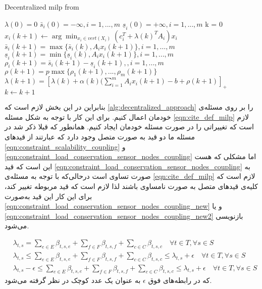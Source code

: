\begin{latin}
	\begin{algorithm}
		\caption{Decentralized milp from \cite{decentralized_approach}}		          \label{alg:decentralized_approach}
		\begin{algorithmic}[1]
			\Procedure{}{}       %
				\State $\lambda(0) = 0$
				\State $\bar{s}_i(0) = -\infty , i = 1,...,m$ 
				\State $\underline{s}_i(0) = +\infty , i = 1,...,m$ 
				\State k = 0
				\Repeat
						\State $x_i(k+1) \gets \arg \displaystyle \min_{x_i \in vert(X_i)} (c_i^T + \lambda(k)^TA_i)x_i$
					\EndFor
					\State $\bar{s}_i(k+1) = \max\{\bar{s}_i(k), A_ix_i(k+1) \} , i = 1, \dots, m$
					\State $\underline{s}_i(k+1) = \min\{\underline{s}_i(k), A_ix_i(k+1) \} , i = 1,...,m$
					\State $\rho_i(k+1) = \bar{s}_i(k+1) - \underline{s}_i(k+1),  , i = 1,...,m$
					\State $\rho(k+1) = p \max \{ \rho_1(k+1), ..., \rho_m(k+1) \}$
					\State $\lambda(k+1) = [\lambda(k) + \alpha(k)(\sum_{i=1}^{m}A_ix_i(k+1)-b+\rho(k+1)]_+$
					\State $k \gets k+1$ 
			\EndProcedure
		\end{algorithmic}
	\end{algorithm}
\end{latin}
	بنابراین در این بخش لازم است که \cref{alg:decentralized_approach} را بر روی مسئله‌ی خودمان اعمال کنیم. برای این کار با توجه به شکل مسئله \cref{eqn:cite_def_milp} لازم است که تغییراتی را در صورت مسئله خودمان ایجاد کنیم. همانطور که قبلا ذکر شد در مسئله ما دو قید به صورت متصل وجود دارد که عبارتند از قیدهای \cref{eqn:constraint_scalability_coupling} و \cref{eqn:constraint_load_conservation_sensor_nodes_coupling} اما مشکلی که هست این است که قید \cref{eqn:constraint_load_conservation_sensor_nodes_coupling} به صورت تساوی است درحالی‌که با توجه به مسئله‌ی \cref{eqn:cite_def_milp} لازم است که کلیه‌ی قیدهای متصل به صورت نامساوی باشند لذا لازم است که قید مربوطه تغییر کند، برای این کار این قید به‌صورت \cref{eqn:constraint_load_conservation_sensor_nodes_coupling_new} و یا \cref{eqn:constraint_load_conservation_sensor_nodes_coupling_new2} بازنویسی می‌شود. 
	
	\begin{subequations}
		\begin{align}
			&\lambda_{t,s} = \sum_{e \in E} \beta_{t,s,e} + \sum_{f \in F} \beta_{t,s,f}
			+\sum_{c \in C}\beta_{t,s,c} \quad \forall{t \in T}, \forall{s \in S} \\
			&\lambda_{t,s} \le \sum_{e \in E} \beta_{t,s,e} + \sum_{f \in F} \beta_{t,s,f}
			+\sum_{c \in C}\beta_{t,s,c} \le \lambda_{t,s}+\epsilon \quad \forall{t \in T}, \forall{s \in S} \label{eqn:constraint_load_conservation_sensor_nodes_coupling_new} \\
			&\lambda_{t,s} - \epsilon \le \sum_{e \in E} \beta_{t,s,e} + \sum_{f \in F} \beta_{t,s,f}
			+\sum_{c \in C}\beta_{t,s,c} \le \lambda_{t,s}+\epsilon \quad \forall{t \in T}, \forall{s \in S}\label{eqn:constraint_load_conservation_sensor_nodes_coupling_new2}
		\end{align}
	\end{subequations}
	که در رابطه‌های فوق $\epsilon$ به عنوان یک عدد کوچک در نظر گرفته می‌شود. 

